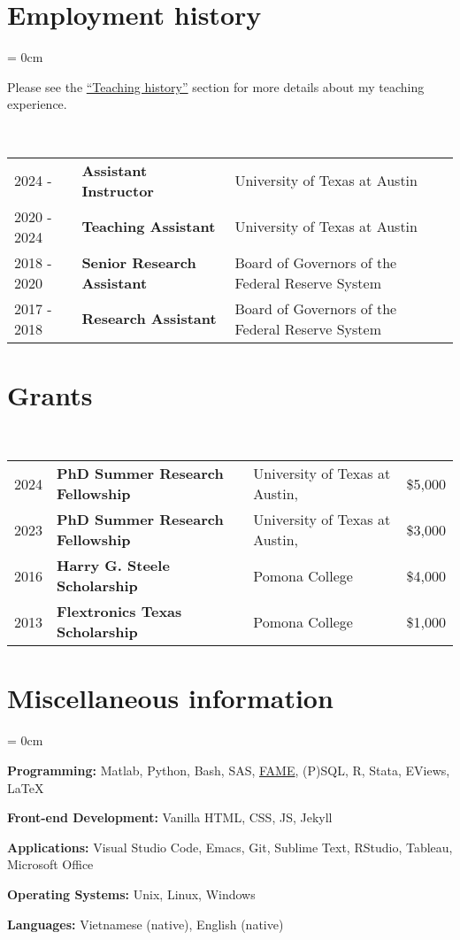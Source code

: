 \documentclass[a4paper, 10pt]{article}
\begin{document}
  \vspace*{0.25em}

  \section{Employment history}
  \begin{compactitem}\parskip = 0cm
    \item Please see the {\hypersetup{linkcolor = black}\hyperref[sec:teaching_history]{``Teaching history''}} section for more details about my teaching experience.
  \end{compactitem}
  \vspace*{0.70em}
  ~\begin{tabular}{lll}
    2024 - & \textbf{Assistant Instructor} & University of Texas at Austin\\
    2020 - 2024 & \textbf{Teaching Assistant} & University of Texas at Austin\\
    2018 - 2020 & \textbf{Senior Research Assistant} & Board of Governors of the Federal Reserve System\\
    2017 - 2018 & \textbf{Research Assistant} & Board of Governors of the Federal Reserve System
  \end{tabular}
  \vspace*{0.25em}
      
  \section{Grants}
  ~\begin{tabular}{llll}
    2024 & \textbf{PhD Summer Research Fellowship} & University of Texas at Austin, & \$5,000\\
    2023 & \textbf{PhD Summer Research Fellowship} & University of Texas at Austin, & \$3,000\\
    2016 & \textbf{Harry G. Steele Scholarship} & Pomona College & \$4,000\\
    2013 & \textbf{Flextronics Texas Scholarship} & Pomona College & \$1,000
  \end{tabular}
  \vspace*{0.25em}
    
  \section{Miscellaneous information}
  \begin{compactitem}\parskip = 0cm
    \item \textbf{Programming:} Matlab, Python, Bash, SAS, \href{https://en.wikipedia.org/wiki/FAME_(database)}{FAME}, (P)SQL, R, Stata, EViews, \LaTeX
    \item \textbf{Front-end Development:} Vanilla HTML, CSS, JS, Jekyll
    \item \textbf{Applications:} Visual Studio Code, Emacs, Git, Sublime Text, RStudio, Tableau, Microsoft Office
    \item \textbf{Operating Systems:} Unix, Linux, Windows
    \item \textbf{Languages:} Vietnamese (native), English (native)
  \end{compactitem}
\end{document}
